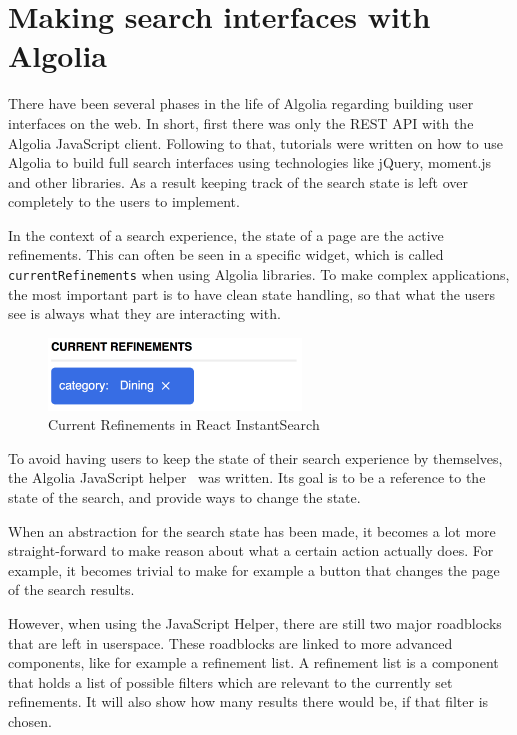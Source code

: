 \section{Making search interfaces with Algolia} %
\label{sec:making_search_interfaces_with_algolia}

There have been several phases in the life of Algolia regarding building user interfaces on the web. In short, first there was only the REST API with the Algolia JavaScript client. Following to that, tutorials were written on how to use Algolia to build full search interfaces using technologies like jQuery, moment.js and other libraries. As a result keeping track of the search state is left over completely to the users to implement.

In the context of a search experience, the state of a page are the active refinements. This can often be seen in a specific widget, which is called {\tt currentRefinements} when using Algolia libraries. To make complex applications, the most important part is to have clean state handling, so that what the users see is always what they are interacting with.

\begin{figure}[H]
  \centering
  \includegraphics[width=0.6\textwidth]{../assets/current-refinements.png}
  \caption{Current Refinements in React InstantSearch\cite{ris-storybooks}}
  \label{figure:current-refinements}
\end{figure}

To avoid having users to keep the state of their search experience by themselves, the Algolia JavaScript helper~\cite{algolia-js-helper} was written. Its goal is to be a reference to the state of the search, and provide ways to change the state.

When an abstraction for the search state has been made, it becomes a lot more straight-forward to make reason about what a certain action actually does. For example, it becomes trivial to make for example a button that changes the page of the search results.

However, when using the JavaScript Helper, there are still two major roadblocks that are left in userspace. These roadblocks are linked to more advanced components, like for example a refinement list. A refinement list is a component that holds a list of possible filters which are relevant to the currently set refinements. It will also show how many results there would be, if that filter is chosen.

